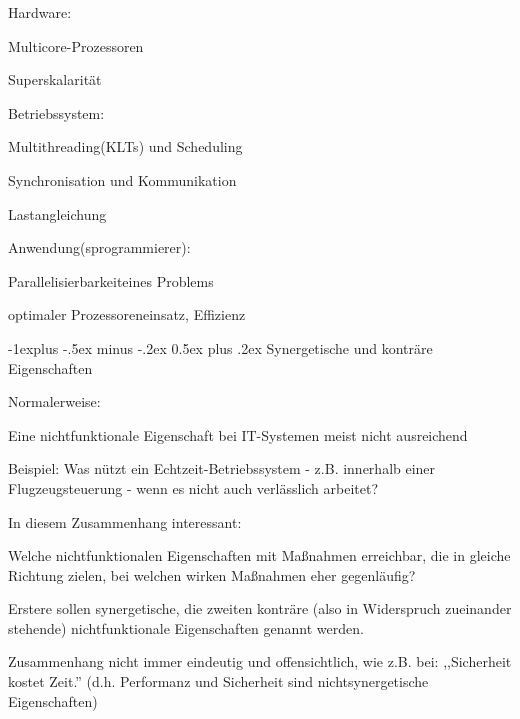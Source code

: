 \documentclass[a4paper]{article}
\makeatletter
\renewcommand{\subsection}{\@startsection{subsection}{2}{0mm}%
 {-1explus -.5ex minus -.2ex}%
 {0.5ex plus .2ex}%
 {\normalfont\normalsize\bfseries}}
\makeatother
\begin{document}
\begin{multicols}{3}
    \begin{itemize*}
        \item Hardware:
        \begin{itemize*}
            \item Multicore-Prozessoren
            \item Superskalarität
        \end{itemize*}
        \item Betriebssystem:
        \begin{itemize*}
            \item Multithreading(KLTs) und Scheduling
            \item Synchronisation und Kommunikation
            \item Lastangleichung
        \end{itemize*}
        \item Anwendung(sprogrammierer):
        \begin{itemize*}
            \item Parallelisierbarkeiteines Problems
            \item optimaler Prozessoreneinsatz, Effizienz
        \end{itemize*}
    \end{itemize*}


    \subsection{Synergetische und konträre
        Eigenschaften}

    \begin{itemize*}
        \item Normalerweise:
        \begin{itemize*}
            \item Eine nichtfunktionale Eigenschaft bei IT-Systemen meist nicht ausreichend
            \item Beispiel: Was nützt ein Echtzeit-Betriebssystem - z.B. innerhalb einer Flugzeugsteuerung - wenn es nicht auch verlässlich arbeitet?
        \end{itemize*}
        \item In diesem Zusammenhang interessant:
        \begin{itemize*}
            \item Welche nichtfunktionalen Eigenschaften mit Maßnahmen erreichbar, die in gleiche Richtung zielen, bei welchen wirken Maßnahmen eher gegenläufig?
            \item Erstere sollen synergetische, die zweiten konträre (also in Widerspruch zueinander stehende) nichtfunktionale Eigenschaften genannt werden.
            \item Zusammenhang nicht immer eindeutig und offensichtlich, wie z.B. bei: ,,Sicherheit kostet Zeit.'' (d.h. Performanz und Sicherheit sind nichtsynergetische Eigenschaften)
        \end{itemize*}
    \end{itemize*}



\end{multicols}
\end{document}
